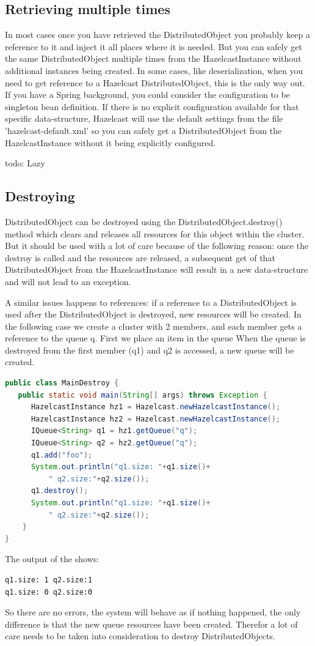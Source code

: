 \subsection{Retrieving multiple times}
In most cases once you have retrieved the DistributedObject you probably keep a reference to it and inject it all places where it is needed. But you can safely get the same DistributedObject multiple times from the HazelcastInstance without additional instances being created. In some cases, like deserialization, when you need to get reference to a Hazelcast DistributedObject, this is the only way out. If you have a Spring background, you could consider the configuration to be singleton bean definition. If there is no explicit configuration available for that specific data-structure, Hazelcast will use the default settings from the file 'hazelcast-default.xml' so you can safely get a DistributedObject from the HazelcastInstance without it being explicitly configured.

todo: Lazy

\subsection{Destroying}
DistributedObject can be destroyed using the DistributedObject.destroy() method which clears and releases all resources for this object within the cluster. But it should be used with a lot of care because of the following reason: once the destroy is called and the resources are released, a subsequent get of that DistributedObject from the HazelcastInstance will result in a new data-structure and will not lead to an exception. 

A similar issues happens to references: if a reference to a DistributedObject is used after the DistributedObject is destroyed, new resources will be created. In the following case we create a cluster with 2 members, and each member gets a reference to the queue q. First we place an item in the queue When the queue is destroyed from the first member (q1) and q2 is accessed, a new queue will be created. 
\begin{lstlisting}[language=java]
public class MainDestroy {
   public static void main(String[] args) throws Exception {
      HazelcastInstance hz1 = Hazelcast.newHazelcastInstance();
      HazelcastInstance hz2 = Hazelcast.newHazelcastInstance();
      IQueue<String> q1 = hz1.getQueue("q");
      IQueue<String> q2 = hz2.getQueue("q");
      q1.add("foo");
      System.out.println("q1.size: "+q1.size()+
          " q2.size:"+q2.size());
      q1.destroy();
      System.out.println("q1.size: "+q1.size()+
          " q2.size:"+q2.size());
    }
}
\end{lstlisting}
The output of the shows:
\begin{lstlisting}
q1.size: 1 q2.size:1
q1.size: 0 q2.size:0
\end{lstlisting}
So there are no errors, the system will behave as if nothing happened, the only difference is that the new queue resources have been created. Therefor a lot of care needs to be taken into consideration to destroy DistributedObjects. 

